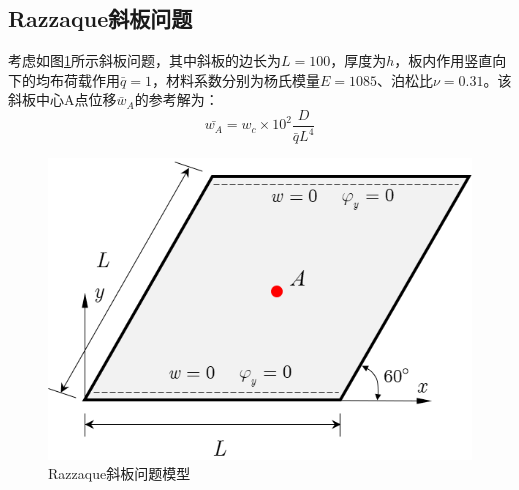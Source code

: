 \subsection{Razzaque斜板问题}
考虑如图\ref{ch_5:fig:Razzaque_plate}所示斜板问题，其中斜板的边长为$L=100$，厚度为$h$，板内作用竖直向下的均布荷载作用$\bar{q}=1$，材料系数分别为杨氏模量$E=1085$、泊松比$\nu=0.31$。该斜板中心A点位移$\bar w_A$的参考解为：
\begin{equation} 
    \bar{w_A}=w_c\times10^2\frac{D}{\bar{q}L^4}
\end{equation}
\begin{figure}[!h]
    \centering 
        \includegraphics[scale=0.8]{figures/ch_5/skew_plate.png}
        \caption{Razzaque斜板问题模型}\label{ch_5:fig:Razzaque_plate}
\end{figure}

